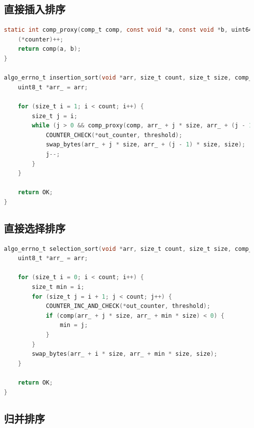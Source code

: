 \documentclass[12pt]{article}
\begin{document}
\subsection{直接插入排序}

\begin{lstlisting}[language=C]
static int comp_proxy(comp_t comp, const void *a, const void *b, uint64_t *counter) {
    (*counter)++;
    return comp(a, b);
}

algo_errno_t insertion_sort(void *arr, size_t count, size_t size, comp_t comp, uint64_t threshold, uint64_t *out_counter) {
    uint8_t *arr_ = arr;

    for (size_t i = 1; i < count; i++) {
        size_t j = i;
        while (j > 0 && comp_proxy(comp, arr_ + j * size, arr_ + (j - 1) * size, out_counter) < 0) {
            COUNTER_CHECK(*out_counter, threshold);
            swap_bytes(arr_ + j * size, arr_ + (j - 1) * size, size);
            j--;
        }
    }

    return OK;
}
\end{lstlisting}

\subsection{直接选择排序}

\begin{lstlisting}[language=C]
algo_errno_t selection_sort(void *arr, size_t count, size_t size, comp_t comp, uint64_t threshold, uint64_t *out_counter) {
    uint8_t *arr_ = arr;

    for (size_t i = 0; i < count; i++) {
        size_t min = i;
        for (size_t j = i + 1; j < count; j++) {
            COUNTER_INC_AND_CHECK(*out_counter, threshold);
            if (comp(arr_ + j * size, arr_ + min * size) < 0) {
                min = j;
            }
        }
        swap_bytes(arr_ + i * size, arr_ + min * size, size);
    }

    return OK;
}
\end{lstlisting}

\subsection{归并排序}
\end{document}
